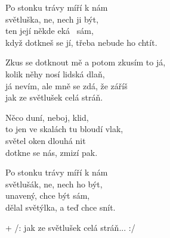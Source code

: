 
\ve{}
Po stonku trávy míří k nám\\
světluška, ne, nech ji být,\\
ten její někde eká \ sám,\\
když dotkneš se jí, třeba nebude ho chtít.

\cho{}
Zkus se dotknout mě a potom zkusím to já,\\
kolik něhy nosí lidská dlaň,\\
já nevím, ale mně se zdá, že záříš\\
jak ze světlušek celá stráň.

\ve{}
Něco duní, neboj, klid,\\
to jen ve skalách tu bloudí vlak,\\
světel oken dlouhá nit\\
dotkne se nás, zmizí pak.

\cho{}

\ve{}
Po stonku trávy míří k nám\\
světlušák, ne, nech ho být,\\
unavený, chce být sám,\\
dělal světýlka, a teď chce snít.

\cho{}
+ /: jak ze světlušek celá stráň... :/

\esong